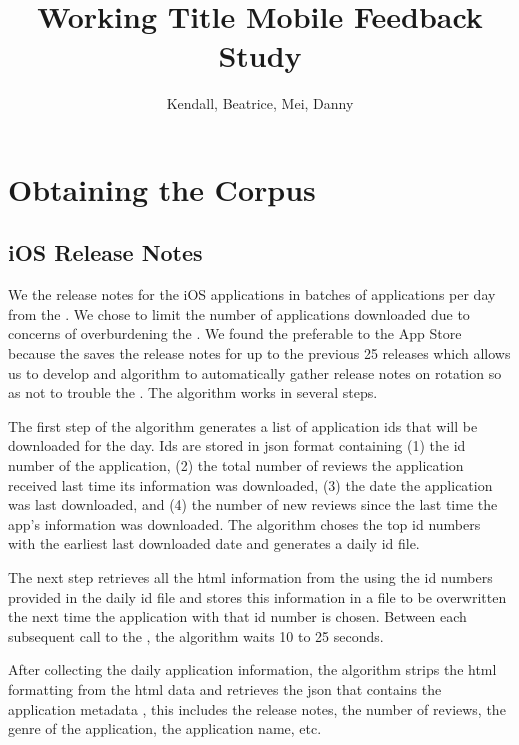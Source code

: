 \documentclass{acm_proc_article-sp}
\begin{document}
\title{Working Title Mobile Feedback Study}

\author{Kendall, Beatrice, Mei, Danny}


\maketitle


\section{Obtaining the Corpus}



\subsection{ iOS Release Notes}
\par We  the release notes for the iOS applications in batches of \RNperDay applications per day from the \ias.
We chose to  limit the number of applications downloaded due to concerns of overburdening the \ias.
We found the \ias preferable to the App Store because the \ias saves the release notes for up to the previous 25 releases which allows us to develop and algorithm to automatically gather release notes on rotation so as not to trouble the \ias.
The algorithm works in several steps.

\par The first step of the algorithm generates a list of application ids that will be downloaded for the day.
Ids are stored in json format containing (1) the id number of the application, (2) the total number of reviews the application received last time its information was downloaded, (3) the date the application was last downloaded, and (4) the number of new reviews since the last time the app's information was downloaded.
The algorithm choses the top \RNperDay id numbers with the earliest last downloaded date and generates a daily id file.

The next step retrieves all the html information from the \ias using the id numbers provided in the daily id file and stores this information in a file to be overwritten the next time the application with that id number is chosen.
Between each subsequent call to the \ias, the algorithm waits 10 to 25 seconds.

After collecting the daily application information, the algorithm strips the html formatting from the html data and retrieves the json that contains the application metadata , this includes the release notes, the number of reviews, the genre of the application, the application name, etc.
\end{document}

